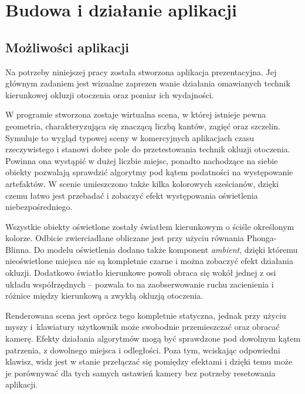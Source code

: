 \chapter{Budowa i działanie aplikacji}
\label{t:budowa}

	\section{Możliwości aplikacji}
	\label{t:budowa:mozliw}
	
	
	Na potrzeby niniejszej pracy została stworzona aplikacja prezentacyjna. Jej głównym zadaniem jest wizualne zaprezen wanie działania omawianych technik kierunkowej okluzji otoczenia oraz pomiar ich wydajności. 
	
	W programie stworzona zostaje wirtualna scena, w której istnieje pewna geometria, charakteryzująca się znaczącą liczbą kantów, zagięć oraz szczelin. Symuluje to wygląd typowej sceny w komercyjnych aplikacjach czasu rzeczywistego i stanowi dobre pole do przetestowania technik okluzji otoczenia. Powinna ona wystąpić w dużej liczbie miejsc, ponadto nachodzące na siebie obiekty pozwalają sprawdzić algorytmy pod kątem podatności na występowanie artefaktów. W scenie umieszczono także kilka kolorowych sześcianów, dzięki czemu łatwo jest przebadać i zobaczyć efekt występowania oświetlenia niebezpośredniego.
	
	Wszystkie obiekty oświetlone zostały światłem kierunkowym o ściśle określonym kolorze. Odbicie zwierciadlane obliczane jest przy użyciu równania Phonga-Blinna. Do modelu oświetlenia dodano także komponent \emph{ambient}, dzięki któremu nieoświetlone miejsca nie są kompletnie czarne i można zobaczyć efekt działania okluzji. Dodatkowo światło kierunkowe powoli obraca się wokół jednej z osi układu współrzędnych -- pozwala to na zaobserwowanie ruchu zacienienia i różnice między kierunkową a zwykłą okluzją otoczenia.
	
	Renderowana scena jest oprócz tego kompletnie statyczna, jednak przy użyciu myszy i~klawiatury użytkownik może swobodnie przemieszczać oraz obracać kamerę. Efekty działania algorytmów mogą być sprawdzone pod dowolnym kątem patrzenia, z dowolnego miejsca i odległości. Poza tym, wciskając odpowiedni klawisz, widz jest w stanie przełączać się pomiędzy efektami i dzięki temu może je porównywać dla tych samych ustawień kamery bez potrzeby resetowania aplikacji.
	
